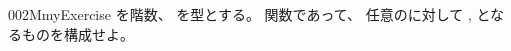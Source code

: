 \documentclass[index]{subfiles}
\begin{document}
\begin{myBlock}{002M}{myExercise}
  を階数、
  を型とする。
  関数であって、
  任意のに対して
  ,
  となるものを構成せよ。
\end{myBlock}
\end{document}
